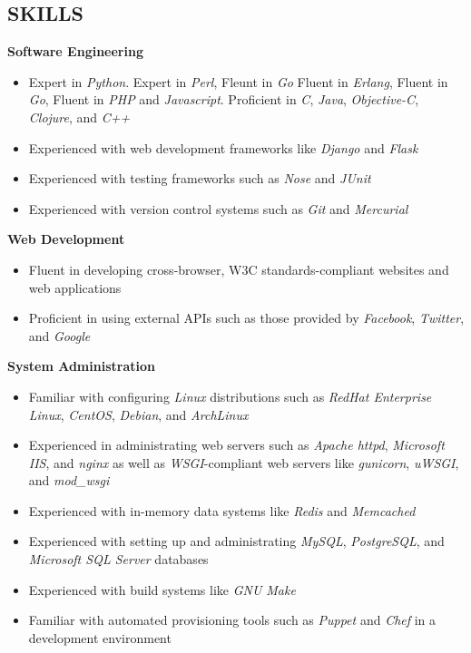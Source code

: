 \documentclass[line,margin]{res}
\begin{document}
\begin{resume}
\section{SKILLS}
    \textbf{Software Engineering}
    \begin{itemize}
        \item Expert in {\sl Python}.
              Expert in {\sl Perl},
              Fleunt in {\sl Go}
              Fluent in {\sl Erlang},
              Fluent in {\sl Go},
              Fluent in {\sl PHP} and {\sl Javascript}.
              Proficient in {\sl C}, {\sl Java}, {\sl Objective-C},
                {\sl Clojure}, and {\sl C++}
        \item Experienced with web development frameworks like {\sl Django}
              and {\sl Flask}
        \item Experienced with testing frameworks such as {\sl Nose} and {\sl JUnit}
        \item Experienced with version control systems such as {\sl Git} and {\sl Mercurial}
    \end{itemize}

    \textbf{Web Development}
    \begin{itemize}
        \item Fluent in developing cross-browser, W3C standards-compliant websites
              and web applications
        \item Proficient in using external APIs such as those provided by {\sl Facebook},
              {\sl Twitter}, and {\sl Google}
    \end{itemize}

    \textbf{System Administration}
    \begin{itemize}
        \item Familiar with configuring {\sl Linux} distributions such as {\sl RedHat
              Enterprise Linux}, {\sl CentOS}, {\sl Debian}, and {\sl ArchLinux}
        \item Experienced in administrating web servers such as {\sl Apache httpd},
              {\sl Microsoft IIS}, and {\sl nginx} as well as
              {\sl WSGI}-compliant web servers like {\sl gunicorn},
              {\sl uWSGI}, and {\sl mod\_wsgi}
        \item Experienced with in-memory data systems like {\sl Redis} and {\sl Memcached}
        \item Experienced with setting up and administrating {\sl MySQL},
              {\sl PostgreSQL}, and {\sl Microsoft SQL Server} databases
        \item Experienced with build systems like {\sl GNU Make}
        \item Familiar with automated provisioning tools such as {\sl Puppet}
              and {\sl Chef} in a development environment
    \end{itemize}




\end{resume}
\end{document}
